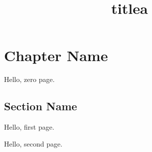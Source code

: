 \documentclass[twoside]{book}
\title{titlea}
\begin{document}
\chapter{Chapter Name}

\newpage
Hello, zero page.

\section{Section Name}
Hello, first page.

\newpage

Hello, second page.
\end{document}
